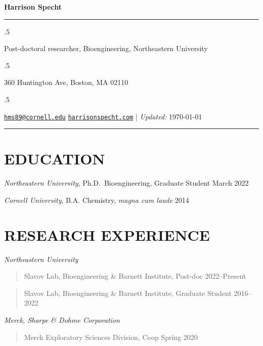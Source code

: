 \documentclass[11pt,]{article}
\begin{document}
\centerline{\huge \bf Harrison Specht}

\vspace{2 mm}

\hrule

\vspace{2 mm}

\moveleft.5\hoffset\centerline{Post-doctoral researcher, Bioengineering,
Northeastern University}
\moveleft.5\hoffset\centerline{360 Huntington Ave, Boston, MA 02110}
\moveleft.5\hoffset\centerline{ \faEnvelopeO \hspace{1 mm} \href{mailto:}{\tt \href{mailto:hms89@cornell.edu}{\nolinkurl{hms89@cornell.edu}}} \hspace{1 mm}     \faGlobe \hspace{1 mm} \href{http://harrisonspecht.com}{\tt harrisonspecht.com}    | \emph{Updated:} \today}

\vspace{2 mm}

\hrule


\hypertarget{education}{%
\section{EDUCATION}\label{education}}

\emph{Northeastern University}, Ph.D.~Bioengineering, Graduate Student
\hfill  March 2022

\emph{Cornell University}, B.A. Chemistry, \emph{magna cum laude}
\hfill 2014

\hypertarget{research-experience}{%
\section{RESEARCH EXPERIENCE}\label{research-experience}}

\emph{Northeastern University}

\begin{quote}
Slavov Lab, Bioengineering \& Barnett Institute, Post-doc
\hfill 2022--Present
\end{quote}

\begin{quote}
Slavov Lab, Bioengineering \& Barnett Institute, Graduate Student
\hfill 2016--2022
\end{quote}

\emph{Merck, Sharpe \& Dohme Corporation}

\begin{quote}
Merck Exploratory Sciences Division, Coop \hfill Spring 2020
\end{quote}
\end{document}
